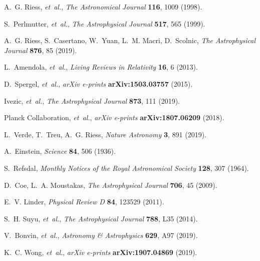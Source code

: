 \documentclass[12pt]{article}
\begin{document}
%
%
\begin{thebibliography}{10}

A.~G. Riess, {\it et~al.\/}, {\it The Astronomical Journal\/} {\bf 116}, 1009
  (1998).

S.~Perlmutter, {\it et~al.\/}, {\it The Astrophysical Journal\/} {\bf 517}, 565
  (1999).

A.~G. Riess, S.~Casertano, W.~Yuan, L.~M. Macri, D.~Scolnic, {\it The
  Astrophysical Journal\/} {\bf 876}, 85 (2019).

L.~Amendola, {\it et~al.\/}, {\it Living Reviews in Relativity\/} {\bf 16}, 6
  (2013).

D.~Spergel, {\it et~al.\/}, {\it arXiv e-prints\/} {\bf arXiv:1503.03757}
  (2015).

Ivezic, {\it et~al.\/}, {\it The Astrophysical Journal\/} {\bf 873}, 111
  (2019).

{Planck Collaboration}, {\it et~al.\/}, {\it arXiv e-prints\/} {\bf
  arXiv:1807.06209} (2018).

L.~Verde, T.~Treu, A.~G. Riess, {\it Nature Astronomy\/} {\bf 3}, 891 (2019).

A.~Einstein, {\it Science\/} {\bf 84}, 506 (1936).

S.~Refsdal, {\it Monthly Notices of the Royal Astronomical Society\/} {\bf
  128}, 307 (1964).

D.~Coe, L.~A. Moustakas, {\it The Astrophysical Journal\/} {\bf 706}, 45
  (2009).

E.~V. Linder, {\it Physical Review D\/} {\bf 84}, 123529 (2011).

S.~H. Suyu, {\it et~al.\/}, {\it The Astrophysical Journal\/} {\bf 788}, L35
  (2014).

V.~Bonvin, {\it et~al.\/}, {\it Astronomy \& Astrophysics\/} {\bf 629}, A97
  (2019).

K.~C. Wong, {\it et~al.\/}, {\it arXiv e-prints\/} {\bf arXiv:1907.04869}
  (2019).


\end{thebibliography}
\end{document}
